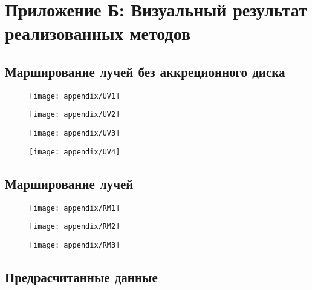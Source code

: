 \appendix
\section*{Приложение Б: Визуальный результат реализованных методов}
\label{sec:Apendix2} 

\subsection*{Марширование лучей без аккреционного диска}

\begin{figure}[H]
    \centering
    \texttt{[image: appendix/UV1]}
\end{figure}

\begin{figure}[H]
    \centering
    \texttt{[image: appendix/UV2]}
\end{figure}

\begin{figure}[H]
    \centering
    \texttt{[image: appendix/UV3]}
\end{figure}

\begin{figure}[H]
    \centering
    \texttt{[image: appendix/UV4]}
\end{figure}

\subsection*{Марширование лучей}

\begin{figure}[H]
    \centering
    \texttt{[image: appendix/RM1]}
\end{figure}

\begin{figure}[H]
    \centering
    \texttt{[image: appendix/RM2]}
\end{figure}

\begin{figure}[H]
    \centering
    \texttt{[image: appendix/RM3]}
\end{figure}

\subsection*{Предрасчитанные данные}

